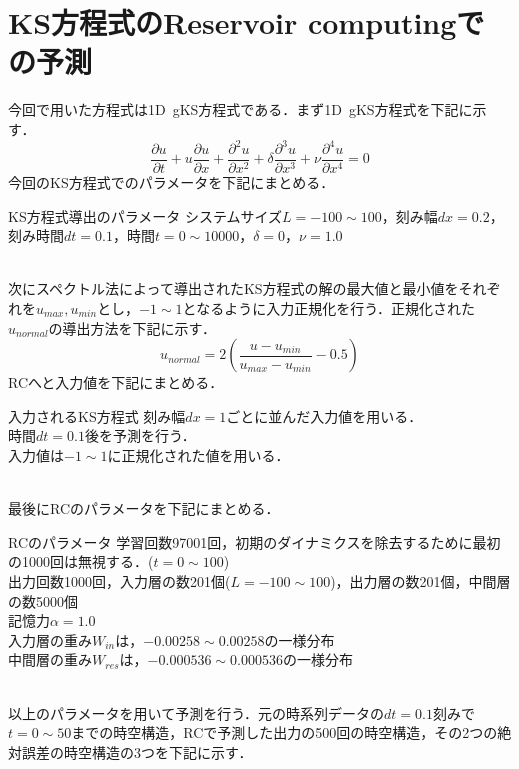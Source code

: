 \documentclass[autodetect-engine,dvipdfmx-if-dvi,ja=standard,a4paper,11pt]{bxjsarticle} %
\begin{document}
\section{KS方程式のReservoir computingでの予測}
今回で用いた方程式は1D\ gKS方程式である．まず1D\ gKS方程式を下記に示す．
\begin{equation}
\frac{\partial u}{\partial t}+u\frac{\partial u}{\partial x}+\frac{\partial^2 u}{\partial x^2}+\delta\frac{\partial^3 u}{\partial x^3}+\nu\frac{\partial^4 u}{\partial x^4}=0
\label{eq:ks}
\end{equation}
今回のKS方程式でのパラメータを下記にまとめる．
\begin{itembox}[l]{KS方程式導出のパラメータ}
システムサイズ$L=-100\sim100$，刻み幅$dx=0.2$，刻み時間$dt=0.1$，時間$t=0\sim 10000$，$\delta=0$，$\nu=1.0$
\end{itembox}
\\
\　次にスペクトル法によって導出されたKS方程式の解の最大値と最小値をそれぞれを$u_{max},u_{min}$とし，$-1\sim1$となるように入力正規化を行う．正規化された$u_{normal}$の導出方法を下記に示す．
\begin{equation}
u_{normal}=2\left(\frac{u-u_{min}}{u_{max}-u_{min}}-0.5\right)
\end{equation}
RCへと入力値を下記にまとめる．
\begin{itembox}[l]{入力されるKS方程式}
刻み幅$dx=1$ごとに並んだ入力値を用いる．\\
時間$dt=0.1$後を予測を行う．\\
入力値は$-1\sim1$に正規化された値を用いる．
\end{itembox}
\\
\　最後にRCのパラメータを下記にまとめる．
\begin{itembox}[l]{RCのパラメータ}
学習回数97001回，初期のダイナミクスを除去するために最初の1000回は無視する．($t=0\sim100$)\\
出力回数1000回，入力層の数201個($L=-100\sim100$)，出力層の数201個，中間層の数5000個\\
記憶力$\alpha=1.0$\\
入力層の重み$W_{in}$は，$-0.00258\sim0.00258$の一様分布\\
中間層の重み$W_{res}$は，$-0.000536\sim0.000536$の一様分布
\end{itembox}
\\
\　以上のパラメータを用いて予測を行う．元の時系列データの$dt=0.1$刻みで$t=0\sim50$までの時空構造，RCで予測した出力の500回の時空構造，その2つの絶対誤差の時空構造の3つを下記に示す．
\end{document}
